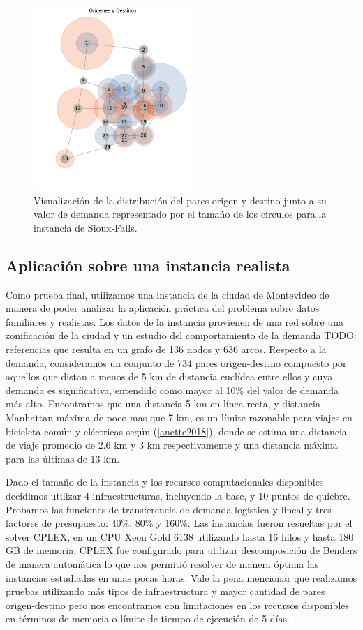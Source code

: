 \documentclass{article}
\begin{document}
  \begin{figure}[h!]
    \centering
    \includegraphics[width=6cm]{../resources/sioux_falls_demand.png}
    \caption{Visualización de la distribución del pares origen y destino junto a su valor de demanda representado por el tamaño de los círculos para la instancia de Sioux-Falls.}
    \label{fig:sioux_falls_demand}
  \end{figure}

  \FloatBarrier
  \subsection{Aplicación sobre una instancia realista}

  Como prueba final, utilizamos una instancia de la ciudad de Montevideo de manera de poder analizar la aplicación práctica del problema sobre datos familiares y realistas. Los datos de la instancia provienen de una red sobre una zonificación de la ciudad y un estudio del comportamiento de la demanda TODO: referencias que resulta en un grafo de 136 nodos y 636 arcos. Respecto a la demanda, consideramos un conjunto de 734 pares origen-destino compuesto por aquellos que distan a menos de 5 km de distancia euclídea entre ellos y cuya demanda es significativa, entendido como mayor al 10\% del valor de demanda más alto. Encontramos que una distancia 5 km en línea recta, y distancia Manhattan máxima de poco mas que 7 km, es un límite razonable para viajes en bicicleta común y eléctricas según (\ref{anette2018}), donde se estima una distancia de viaje promedio de 2.6 km y 3 km respectivamente y una distancia máxima para las últimas de 13 km.

  Dado el tamaño de la instancia y los recursos computacionales disponibles decidimos utilizar 4 infraestructuras, incluyendo la base, y 10 puntos de quiebre. Probamos las funciones de transferencia de demanda logística y lineal y tres factores de presupuesto: 40\%, 80\% y 160\%. Las instancias fueron resueltas por el solver CPLEX, en un CPU Xeon Gold 6138 utilizando hasta 16 hilos y hasta 180 GB de memoria. CPLEX fue configurado para utilizar descomposición de Benders de manera automática lo que nos permitió resolver de manera óptima las instancias estudiadas en unas pocas horas. Vale la pena mencionar que realizamos pruebas utilizando más tipos de infraestructura y mayor cantidad de pares origen-destino pero nos encontramos con limitaciones en los recursos disponibles en términos de memoria o límite de tiempo de ejecución de 5 días.
\end{document}
